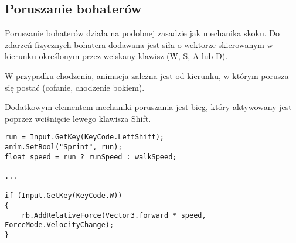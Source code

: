 \subsection{Poruszanie bohaterów}

Poruszanie bohaterów działa na podobnej zasadzie jak mechanika skoku. Do zdarzeń fizycznych bohatera dodawana jest siła o wektorze skierowanym w kierunku określonym przez wciskany klawisz (W, S, A lub D).

W przypadku chodzenia, animacja zależna jest od kierunku, w którym porusza się postać (cofanie, chodzenie bokiem).

Dodatkowym elementem mechaniki poruszania jest bieg, który aktywowany jest poprzez wciśnięcie lewego klawisza Shift.

\begin{lstlisting}[caption={Fragment kodu mechaniki biegania -- reakcja na wciśnięcie klawisza \name{W}}]
run = Input.GetKey(KeyCode.LeftShift);
anim.SetBool("Sprint", run);
float speed = run ? runSpeed : walkSpeed;

...

if (Input.GetKey(KeyCode.W))
{
    rb.AddRelativeForce(Vector3.forward * speed, ForceMode.VelocityChange);
}
\end{lstlisting}
